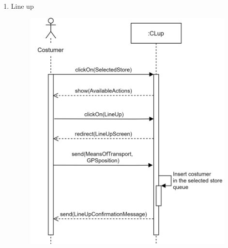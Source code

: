 \documentclass[]{article}
\begin{document}
\begin{enumerate}
						\item Line up
						\begin{figure}[H]
							\centering
							\includegraphics[scale=1.1]{lineup.png}
							\caption{}
							\label{fig:lineup_sequencediagramm}
						\end{figure}
						\newpage	
						

\end{enumerate}
\end{document}
